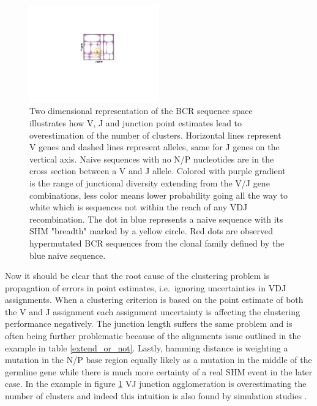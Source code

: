 \begin{figure}[ht]
    \centering
    \includegraphics[width=0.5\textwidth]{figures/VJ_CDR3_agglomeration.pdf}
    \caption{
        \label{fig:VJ_CDR3_agglomeration}
        Two dimensional representation of the BCR sequence space illustrates how V, J and junction point estimates lead to overestimation of the number of clusters.
        Horizontal lines represent V genes and dashed lines represent alleles, same for J genes on the vertical axis.
        Naive sequences with no N/P nucleotides are in the cross section between a V and J allele.
        Colored with purple gradient is the range of junctional diversity extending from the V/J gene combinations, less color means lower probability going all the way to white which is sequences not within the reach of any VDJ recombination.
        The dot in blue represents a naive sequence with its SHM "breadth" marked by a yellow circle.
        Red dots are observed hypermutated BCR sequences from the clonal family defined by the blue naive sequence.
    }
\end{figure}


Now it should be clear that the root cause of the clustering problem is propagation of errors in point estimates, i.e.\ ignoring uncertainties in VDJ assignments.
When a clustering criterion is based on the point estimate of both the V and J assignment each assignment uncertainty is affecting the clustering performance negatively.
The junction length suffers the same problem and is often being further problematic because of the alignments issue outlined in the example in table \ref{extend_or_not}.
Lastly, hamming distance is weighting a mutation in the N/P base region equally likely as a mutation in the middle of the germline gene while there is much more certainty of a real SHM event in the later case.
In the example in figure \ref{fig:VJ_CDR3_agglomeration} VJ junction agglomeration is overestimating the number of clusters and indeed this intuition is also found by simulation studies \cite{ralph2016likelihood}.


